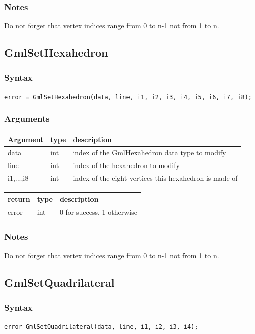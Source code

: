 \documentclass[a4paper,12pt]{article}
\begin{document}
\subsubsection*{Notes}
Do not forget that vertex indices range from 0 to n-1 not from 1 to n.


\subsection{GmlSetHexahedron}
\subsubsection*{Syntax}
{\tt error = GmlSetHexahedron(data, line, i1, i2, i3, i4, i5, i6, i7, i8);}
\subsubsection*{Arguments}

\begin{tabular}{|m{2cm}|m{1.5cm}|m{10.5cm}|}
\hline
Argument   & type   & description \\
\hline
data       & int    & index of the GmlHexahedron data type to modify \\
\hline
line       & int    & index of the hexahedron to modify \\
\hline
i1,...,i8  & int    & index of the eight vertices this hexahedron is made of \\
\hline
\end{tabular}

\medskip

\begin{tabular}{|m{2cm}|m{1.5cm}|m{10.5cm}|}
\hline
return     & type   & description \\
\hline
error      & int    & 0 for success, 1 otherwise \\
\hline
\end{tabular}
\subsubsection*{Notes}
Do not forget that vertex indices range from 0 to n-1 not from 1 to n.


\subsection{GmlSetQuadrilateral}
\subsubsection*{Syntax}
{\tt error GmlSetQuadrilateral(data, line, i1, i2, i3, i4);}
\end{document}
